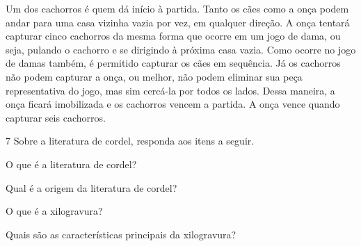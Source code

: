 Um dos cachorros é quem dá início à partida. Tanto os cães como a onça
podem andar para uma casa vizinha vazia por vez, em qualquer direção. A
onça tentará capturar cinco cachorros da mesma forma que ocorre em um
jogo de dama, ou seja, pulando o cachorro e se dirigindo à próxima casa
vazia. Como ocorre no jogo de damas também, é permitido capturar os
cães em sequência. Já os cachorros não podem capturar a onça, ou melhor,
não podem eliminar sua peça representativa do jogo, mas sim cercá-la por
todos os lados. Dessa maneira, a onça ficará imobilizada e os cachorros
vencem a partida. A onça vence quando capturar seis cachorros.


\bigskip
\bigskip
\num{7}  Sobre a literatura de cordel, responda aos itens a seguir.

\begin{escolha}
\item O que é a literatura de cordel?\\

\item Qual é a origem da literatura de cordel?\\

\item O que é a xilogravura?\\

\item Quais são as características principais da xilogravura?\\
\end{escolha}


